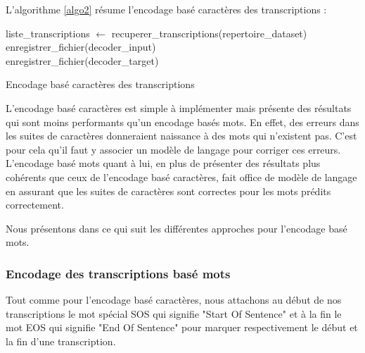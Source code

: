 L'algorithme \ref{algo2} résume l'encodage basé caractères des transcriptions :

\begin{algorithm2e}[H]
\SetAlgoLined
{}
\BlankLine
 liste\_transcriptions $\gets$ recuperer\_transcriptions(repertoire\_dataset) \\
 enregistrer\_fichier(decoder\_input) \\
 enregistrer\_fichier(decoder\_target)
 \caption{Encodage basé caractères des transcriptions \label{algo2}}
 \label{enc_car}
\end{algorithm2e}

L'encodage basé caractères est simple à implémenter mais présente des résultats qui sont moins performants qu'un encodage basés mots. En effet, des erreurs dans les suites de caractères donneraient naissance à des mots qui n'existent pas. C'est pour cela qu'il faut y associer un modèle de langage pour corriger ces erreurs. L'encodage basé mots quant à lui, en plus de présenter des résultats plus cohérents que ceux de l'encodage basé caractères, fait office de modèle de langage en assurant que les suites de caractères sont correctes pour les mots prédits correctement.

Nous présentons dans ce qui suit les différentes approches pour l'encodage basé mots.
 

\subsubsection{Encodage des transcriptions basé mots}\label{word_based}
Tout comme pour l'encodage basé caractères, nous attachons au début de nos transcriptions le mot spécial SOS qui signifie "Start Of Sentence" et à la fin le mot EOS qui signifie "End Of Sentence" pour marquer respectivement le début et la fin d'une transcription.


